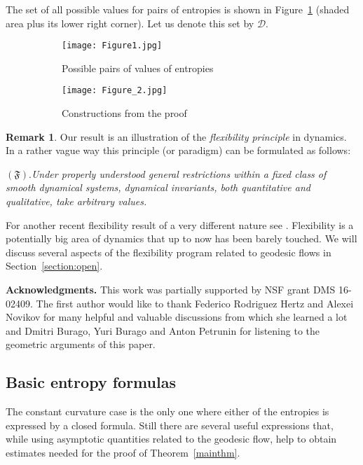 \documentclass[12pt]{article}
\numberwithin{equation}{section}
\theoremstyle{definition}
\newtheorem{rem}[lem]{Remark}
\begin{document}
The set of all possible values for pairs of entropies is shown in Figure~\ref{fig:ent_set} (shaded area plus its lower right corner). Let us denote this set by $\mathcal D$.



\begin{figure}[H]
\centering
\begin{subfigure}{.5\textwidth}
  \centering
  \texttt{[image: Figure1.jpg]}
  \caption{Possible pairs of values of entropies}
  \label{fig:ent_set}
\end{subfigure}%
\begin{subfigure}{.5\textwidth}
  \centering
  \texttt{[image: Figure\_2.jpg]}
  \caption{Constructions from the proof}
  \label{fig:constr_set}
\end{subfigure}
\caption{}
\label{fig:entropies}
\end{figure}

\begin{rem} Our result is an  illustration of the {\em flexibility principle} in dynamics. In a rather vague way this principle (or paradigm)  can be formulated as follows:\medskip

\noindent  $(\mathfrak F )$.{\em Under properly understood general restrictions  within a fixed class of smooth dynamical systems, dynamical invariants, both quantitative and qualitative,  take  arbitrary values.}
\medskip

\noindent For another recent  flexibility result of a very different nature see \cite{BKRH}. Flexibility is a potentially  big area of dynamics that up to now has been barely touched. We will discuss several aspects of the flexibility program related to geodesic flows  in Section~\ref{section:open}.
\end{rem}
\medskip

\textbf{Acknowledgments.} This work was partially supported by NSF grant DMS 16-02409. The first author would like to thank Federico Rodriguez Hertz and Alexei Novikov for many helpful and valuable discussions from which she learned a lot and Dmitri Burago, Yuri Burago and Anton Petrunin for listening to the geometric arguments of this paper.

\subsection{Basic entropy formulas}
The constant curvature case is the only one where either of the entropies  is expressed by a closed formula. Still there are several useful expressions that, while  using  asymptotic quantities  related to the geodesic flow, help to obtain estimates needed for the proof of Theorem~\ref{mainthm}.
\bigskip
\end{document}

